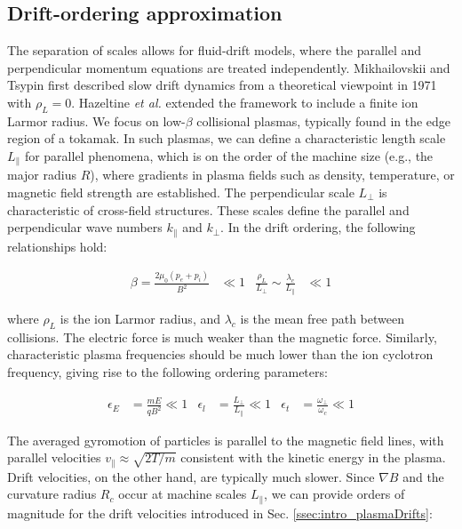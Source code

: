 \subsection{Drift-ordering approximation}
\label{ssec:edge_driftOrdering}
The separation of scales allows for fluid-drift models, where the parallel and perpendicular momentum equations are treated independently. Mikhailovskii and Tsypin\cite{mikhailovskii1971transport} first described slow drift dynamics from a theoretical viewpoint in 1971 with $\rho_L = 0$. Hazeltine \emph{et al.}\cite{hazeltine1985four} extended the framework to include a finite ion Larmor radius. We focus on low-$\beta$ collisional plasmas, typically found in the edge region of a tokamak. In such plasmas, we can define a characteristic length scale $L_\parallel$ for parallel phenomena, which is on the order of the machine size (e.g., the major radius $R$), where gradients in plasma fields such as density, temperature, or magnetic field strength are established. The perpendicular scale $L_\perp$ is characteristic of cross-field structures. These scales define the parallel and perpendicular wave numbers $k_\parallel$ and $k_\perp$. In the drift ordering, the following relationships hold\cite{simakov_2003}:

\begin{align}
	\beta = \frac{2\mu_0(p_e + p_i)}{B^2} &\ll 1 & \frac{\rho_L}{L_\perp} \sim \frac{\lambda_c}{L_\parallel} &\ll 1
\end{align}

where $\rho_L$ is the ion Larmor radius, and $\lambda_c$ is the mean free path between collisions. The electric force is much weaker than the magnetic force. Similarly, characteristic plasma frequencies should be much lower than the ion cyclotron frequency, giving rise to the following ordering parameters:

\begin{align}
	\epsilon_E &= \frac{mE}{qB^2} \ll 1 & \epsilon_l &= \frac{L_\perp}{L_\parallel} \ll 1 & \epsilon_t &= \frac{\omega_\perp}{\omega_c} \ll 1
\end{align}

The averaged gyromotion of particles is parallel to the magnetic field lines, with parallel velocities $v_\parallel \approx \sqrt{2T/m}$ consistent with the kinetic energy in the plasma. Drift velocities, on the other hand, are typically much slower. Since $\nabla B$ and the curvature radius $R_c$ occur at machine scales $L_\parallel$, we can provide orders of magnitude for the drift velocities introduced in Sec. \ref{ssec:intro_plasmaDrifts}:

